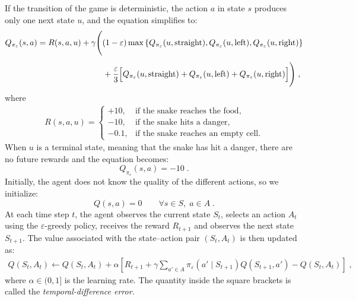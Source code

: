 \documentclass[12pt,a4paper]{article}
\begin{document}
If the transition of the game is deterministic, the action $a$ in state $s$
produces only one next state $u$, and the equation simplifies to:
\begin{align*}
	Q_{\pi_\varepsilon}(s,a)
	&=
	R(s,a,u)
	+
	\gamma
	\Bigg(
	(1-\varepsilon)
	\max
	\left\{
	Q_{\pi_\varepsilon}(u,\text{straight}),
	Q_{\pi_\varepsilon}(u,\text{left}),
	Q_{\pi_\varepsilon}(u,\text{right})
	\right\} \\[4pt]
	&\hspace{2.8cm}
	+
	\frac{\varepsilon}{3}
	\Big[
	Q_{\pi_\varepsilon}(u,\text{straight})
	+
	Q_{\pi_\varepsilon}(u,\text{left})
	+
	Q_{\pi_\varepsilon}(u,\text{right})
	\Big]
	\Bigg)\;,
\end{align*}
where
\begin{align*}
	R(s,a,u)
	=
	\begin{cases}
		+10, & \text{if the snake reaches the food},\\[7pt]
		-10, & \text{if the snake hits a danger},\\[7pt]
		-0.1, & \text{if the snake reaches an empty cell}.
	\end{cases}
\end{align*}
When $u$ is a terminal state, meaning that the snake has hit a danger,
there are no future rewards and the equation becomes:
$$
Q_{\pi_\varepsilon}(s,a)=-10\;.
$$
Initially, the agent does not know the quality of the different actions, so we initialize:
$$
Q(s,a)=0
\qquad
\forall s\in S,\;a\in A\;.
$$
At each time step $t$, the agent observes the current state $S_t$, selects an action $A_t$ using the $\varepsilon$-greedy policy, receives the reward $R_{t+1}$ and observes the next state $S_{t+1}$. The value associated with the state--action pair $(S_t,A_t)$ is then updated as:
\begin{align*}
	Q(S_t,A_t)
	\leftarrow
	Q(S_t,A_t)
	+
	\alpha
	\left[
	R_{t+1}
	+
	\gamma
	\sum_{a'\in A}
	\pi_\varepsilon(a'\mid S_{t+1})
	Q(S_{t+1},a')
	-
	Q(S_t,A_t)
	\right]\;,
\end{align*}
where $\alpha\in(0,1]$ is the learning rate. The quantity inside the square brackets is called the \textit{temporal-difference error}.
\end{document}
